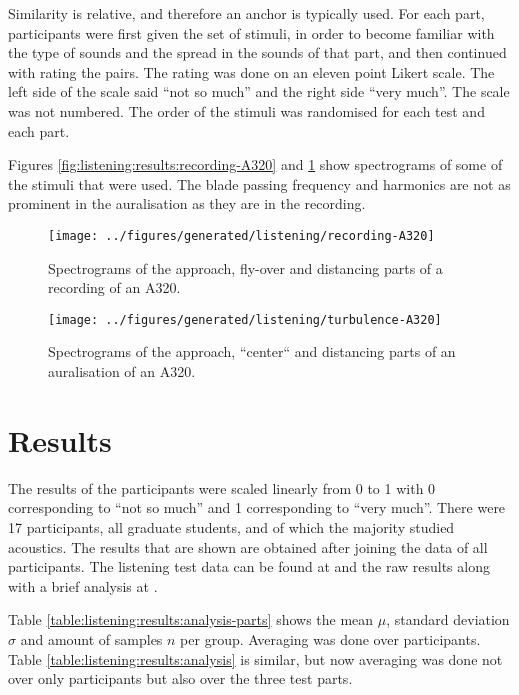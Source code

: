 Similarity is relative, and therefore an anchor is typically used. For each
part, participants were first given the set of stimuli, in order to become
familiar with the type of sounds and the spread in the sounds of that part, and
then continued with rating the pairs. The rating was done on an eleven point
Likert scale. The left side of the scale said ``not so much'' and the right side
``very much''. The scale was not numbered. The order of the stimuli was
randomised for each test and each part.

Figures \ref{fig:listening:results:recording-A320} and
\ref{fig:listening:results:simulation-A320} show spectrograms of some of the stimuli
that were used. The blade passing frequency and harmonics are not as prominent
in the auralisation as they are in the recording.

\begin{figure}[H]
  \centering
  \texttt{[image: ../figures/generated/listening/recording-A320]}
  \caption{Spectrograms of the approach, fly-over and distancing parts of a recording of an A320.}
  \label{fig:listening:results:recording-A320}
%
  \centering
  \texttt{[image: ../figures/generated/listening/turbulence-A320]}
  \caption{Spectrograms of the approach, ``center`` and distancing parts of an auralisation of an A320.}
  \label{fig:listening:results:simulation-A320}
\end{figure}

\newpage
\section{Results}
The results of the participants were scaled linearly from 0 to 1 with 0
corresponding to ``not so much'' and 1 corresponding to ``very much''.
There were 17 participants, all graduate students, and of which the majority
studied acoustics. The results that are shown are obtained after joining the
data of all participants. %
The listening test data can be found at \cite{Rietdijk2017a} and the
raw results along with a brief analysis at \cite{Rietdijk2017b}.

Table \ref{table:listening:results:analysis-parts} shows the mean $\mu$,
standard deviation $\sigma$ and amount of samples $n$ per group.
Averaging was done over participants. Table \ref{table:listening:results:analysis} is similar,
but now averaging was done not over only participants but also over the three test parts.

